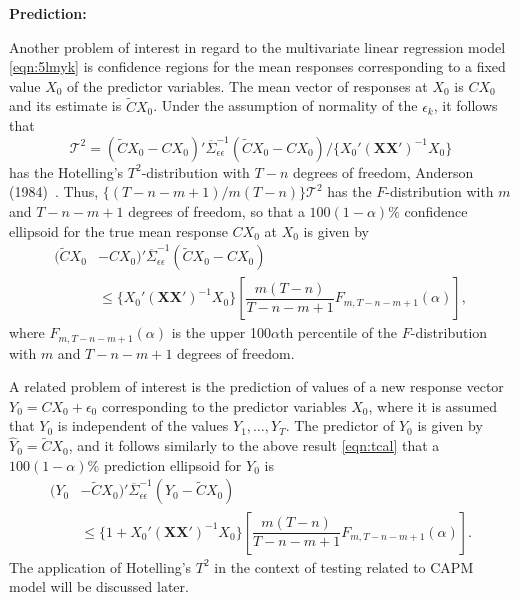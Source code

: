\noindent \textbf{Prediction:} \twomedskip


Another problem of interest in regard to the multivariate linear regression model \eqref{eqn:5lmyk} is confidence regions for the mean responses corresponding to a fixed value $X_0$ of the predictor variables. The mean vector of responses at $X_0$ is $CX_0$ and its estimate is $\tilde{C}X_0$. Under the assumption of normality of the $\epsilon_k$, it follows that
	\begin{equation} \label{eqn:tcal}
	\mathcal{T}^2= ( \tilde{C }X_0 - CX_0)' \overline{\Sigma}_{\epsilon\epsilon}^{-1} (\tilde{C} X_0 - CX_0) / \{X_0'(\mathbf{X} \mathbf{X}')^{-1}X_0 \}
	\end{equation}
has the Hotelling's $T^2$-distribution with $T - n$ degrees of freedom, Anderson (1984)~\cite[Chap. 5]{andersontw2}. Thus, $\{(T - n - m + 1)/ m(T - n)\} \mathcal{T}^2$ has the $F$-distribution with $m$ and $T - n - m + 1$ degrees of freedom, so that a $100(1 - \alpha)\%$ confidence ellipsoid for the true mean response $CX_0$ at $X_0$ is given by 
	\begin{equation} \label{eqn:52line}
	\begin{split}
	(\tilde{C}X_0 & -CX_0)' \overline{\Sigma}_{\epsilon\epsilon}^{-1} (\tilde{C}X_0 - CX_0) \\
	&\leq \{X_0' (\mathbf{X}\mathbf{X}')^{-1} X_0\} \left[ \dfrac{m(T - n)}{T - n - m + 1} F_{m,T - n - m + 1}(\alpha) \right],
	 \end{split}
	\end{equation}
where $F_{m,T - n - m + 1}(\alpha)$ is the upper 100$\alpha$th percentile of the $F$-distribution with $m$ and $T - n - m + 1$ degrees of freedom. 


A related problem of interest is the prediction of values of a new response vector $Y_0= CX_0 + \epsilon_0$ corresponding to the predictor variables $X_0$, where it is assumed that $Y_0$ is independent of the values $Y_1, \ldots, Y_T$. The predictor of $Y_0$ is given by $\hat{Y}_0= \tilde{C}X_0$, and it follows similarly to the above result \eqref{eqn:tcal} that a $100(1 - \alpha)\%$ prediction ellipsoid for $Y_0$ is
	\begin{equation} \label{eqn:52another2}
	\begin{split}
	(Y_0 & -\tilde{C}X_0)' \overline{\Sigma}_{\epsilon\epsilon}^{-1} (Y_0 - \tilde{C} X_0) \\
	&\leq \{1 + X_0'(\mathbf{X}\mathbf{X}')^{-1} X_0\} \left[ \dfrac{m(T - n)}{T - n - m + 1} F_{m,T - n - m + 1}(\alpha) \right].
	\end{split}
	\end{equation}
The application of Hotelling's $T^2$ in the context of testing related to CAPM model will be discussed later.



